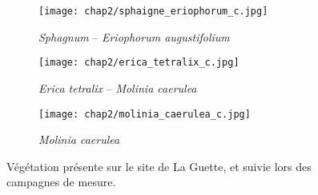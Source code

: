 \begin{figure}[htbp]
    \centering
    \begin{subfigure}[b]{.98\textwidth} %
        \centering \texttt{[image: chap2/sphaigne\_eriophorum\_c.jpg]}
        \caption{\textit{Sphagnum} -- \textit{Eriophorum augustifolium}}\label{fig:sphg_erio}
    \end{subfigure}
    
    \begin{subfigure}[b]{0.49\textwidth}
        \centering \texttt{[image: chap2/erica\_tetralix\_c.jpg]}
        \caption{\textit{Erica tetralix} -- \textit{Molinia caerulea}}\label{fig:erica}
    \end{subfigure}
    \begin{subfigure}[b]{0.49\textwidth}
        \centering \texttt{[image: chap2/molinia\_caerulea\_c.jpg]}
        \caption{\textit{Molinia caerulea}}\label{fig:mol}
    \end{subfigure}

    \caption{Végétation présente sur le site de La Guette, et suivie lors des campagnes de mesure.}\label{fig:veg}
\end{figure}


%
%

